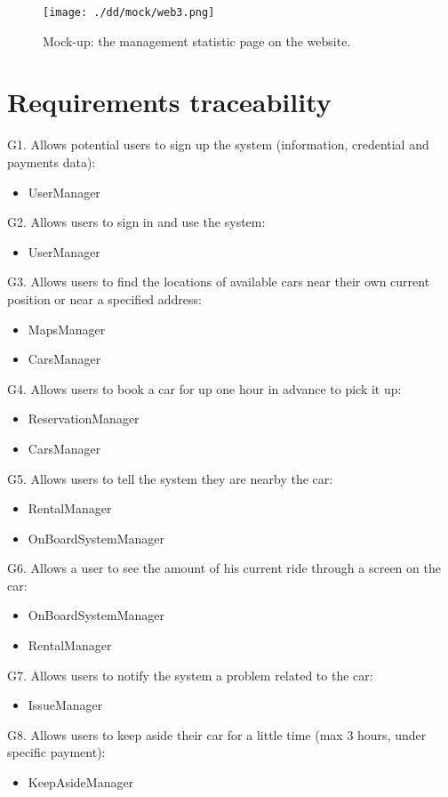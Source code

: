 \documentclass{scrreprt}
\begin{document}
\begin{figure}[htb]
\centering
		\texttt{[image: ./dd/mock/web3.png]}
		\caption{Mock-up: the management statistic page on the website.}
		\label{web3MU}
\end{figure}


\chapter{Requirements traceability}
G1. Allows potential users to sign up the system (information, credential and payments data):
\begin{itemize}
\item UserManager
\end{itemize}
G2. Allows users to sign in and use the system:
\begin{itemize}
\item UserManager
\end{itemize}
G3. Allows users to find the locations of available cars near their own current position or near a specified address:
\begin{itemize}
\item MapsManager
\item CarsManager
\end{itemize}
G4. Allows users to book a car for up one hour in advance to pick it up:
\begin{itemize}
\item ReservationManager
\item CarsManager
\end{itemize}
G5. Allows users to tell the system they are nearby the car:
\begin{itemize}
\item RentalManager
\item OnBoardSystemManager
\end{itemize}
G6. Allows a user to see the amount of his current ride through a screen on the car:
\begin{itemize}
\item OnBoardSystemManager
\item RentalManager
\end{itemize}
G7. Allows users to notify the system a problem related to the car:
\begin{itemize}
\item IssueManager
\end{itemize}
G8. Allows users to keep aside their car for a little time (max 3 hours, under specific payment):
\begin{itemize}
\item KeepAsideManager
\end{itemize}
\end{document}
